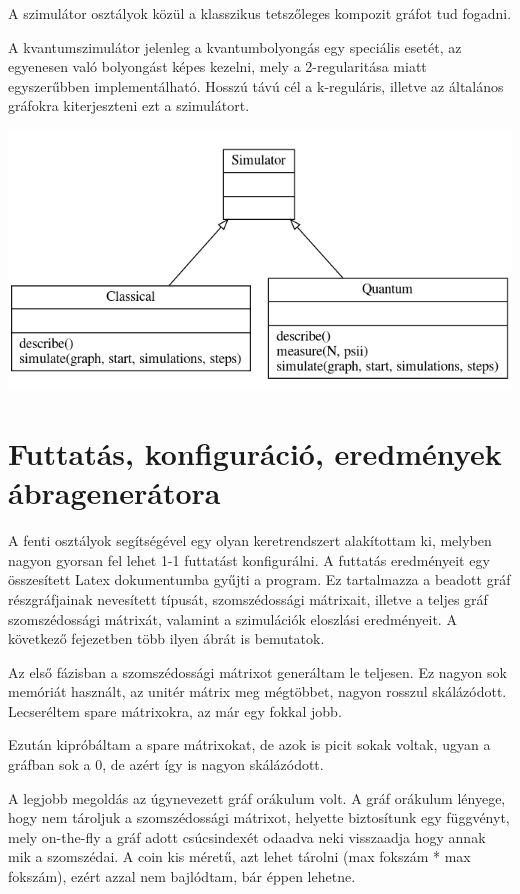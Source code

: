 A szimulátor osztályok közül a klasszikus tetszőleges kompozit gráfot tud
fogadni.


A kvantumszimulátor jelenleg a kvantumbolyongás egy speciális esetét, az egyenesen való bolyongást képes kezelni, mely a 2-regularitása miatt egyszerűbben implementálható. Hosszú távú cél a k-reguláris, illetve az általános gráfokra kiterjeszteni ezt a szimulátort.

\begin{center}
  \includegraphics[width=0.8\linewidth]{./figures/program/simulator.png}
\end{center}

\section{Futtatás, konfiguráció, eredmények ábragenerátora}


A fenti osztályok segítségével egy olyan keretrendszert alakítottam ki, melyben
nagyon gyorsan fel lehet 1-1 futtatást konfigurálni. A futtatás eredményeit egy
összesített Latex dokumentumba gyűjti a program. Ez tartalmazza a beadott gráf
részgráfjainak nevesített típusát, szomszédossági mátrixait, illetve a teljes
gráf szomszédossági mátrixát, valamint a szimulációk eloszlási eredményeit. A
következő fejezetben több ilyen ábrát is bemutatok.



Az első fázisban a szomszédossági mátrixot generáltam le teljesen. Ez nagyon sok memóriát használt, az unitér mátrix meg mégtöbbet, nagyon rosszul skálázódott. Lecseréltem spare mátrixokra, az már egy fokkal jobb.


Ezután kipróbáltam a spare mátrixokat, de azok is picit sokak voltak, ugyan a gráfban sok a 0, de azért
így is nagyon skálázódott.

A legjobb megoldás az úgynevezett gráf orákulum volt. A gráf orákulum lényege, hogy nem tároljuk a szomszédossági mátrixot, helyette biztosítunk egy függvényt, mely on-the-fly a gráf adott csúcsindexét odaadva neki visszaadja hogy annak mik a szomszédai. A coin kis méretű, azt lehet tárolni (max fokszám * max fokszám), ezért azzal nem bajlódtam, bár éppen lehetne.